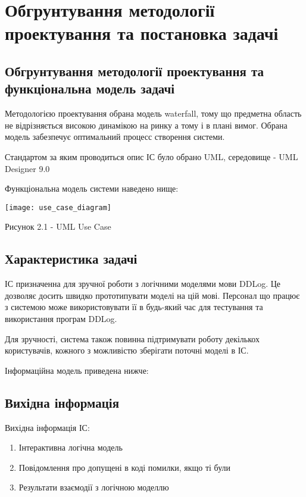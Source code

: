 \chapter{Обгрунтування методології проектування та постановка задачі}
\label{chap:second}

\section{Обгрунтування методології проектування та функціональна модель задачі}

Методологією проектування обрана модель waterfall, тому що предметна область не відрізняється високою динамікою на ринку а тому і в плані вимог. Обрана модель забезпечує оптимальний процесс створення системи.

Стандартом за яким проводиться опис ІС було обрано UML, середовище - UML Designer 9.0

Функціональна модель системи наведено нище:

\begin{center}

\texttt{[image: use\_case\_diagram]}

Рисунок 2.1 - UML Use Case
\end{center}

\section{Характеристика задачі}

ІС призначенна для зручної роботи з логічними моделями мови DDLog. Це дозволяє досить швидко прототипувати моделі на цій мові. Персонал що працює з системою може використовувати її в будь-який час для тестування та використання програм DDLog.

Для зручності, система також повинна підтримувати роботу декількох користувачів, кожного з можливістю зберігати поточні моделі в ІС.
 
Інформаційна модель приведена нижче: 

\section{Вихідна інформація}

Вихідна інформація ІС: 

\begin{enumerate}
	\item Інтерактивна логічна модель
	\item Повідомлення про допущені в коді помилки, якщо ті були
	\item Результати взаємодії з логічною моделлю
\end{enumerate}

